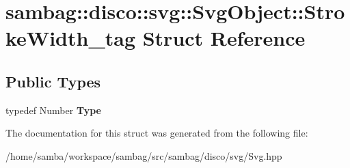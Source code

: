 \hypertarget{structsambag_1_1disco_1_1svg_1_1_svg_object_1_1_stroke_width__tag}{
\section{sambag::disco::svg::SvgObject::StrokeWidth\_\-tag Struct Reference}
\label{structsambag_1_1disco_1_1svg_1_1_svg_object_1_1_stroke_width__tag}
}
\subsection*{Public Types}
\begin{DoxyCompactItemize}
\item 
\hypertarget{structsambag_1_1disco_1_1svg_1_1_svg_object_1_1_stroke_width__tag_ae1b3dd28a1387f8c50c05ae15ba01f3d}{
typedef Number {\bfseries Type}}
\label{structsambag_1_1disco_1_1svg_1_1_svg_object_1_1_stroke_width__tag_ae1b3dd28a1387f8c50c05ae15ba01f3d}

\end{DoxyCompactItemize}


The documentation for this struct was generated from the following file:\begin{DoxyCompactItemize}
\item 
/home/samba/workspace/sambag/src/sambag/disco/svg/Svg.hpp\end{DoxyCompactItemize}
